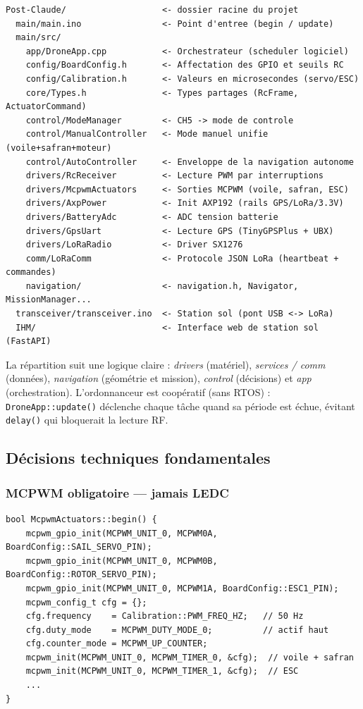 \documentclass[12pt,a4paper]{article}
\newcommand{\file}[1]{\texttt{#1}}
\begin{document}
\begin{lstlisting}[style=shell, caption={Arborescence du projet (racine = Post-Claude)}]
Post-Claude/                   <- dossier racine du projet
  main/main.ino                <- Point d'entree (begin / update)
  main/src/
    app/DroneApp.cpp           <- Orchestrateur (scheduler logiciel)
    config/BoardConfig.h       <- Affectation des GPIO et seuils RC
    config/Calibration.h       <- Valeurs en microsecondes (servo/ESC)
    core/Types.h               <- Types partages (RcFrame, ActuatorCommand)
    control/ModeManager        <- CH5 -> mode de controle
    control/ManualController   <- Mode manuel unifie (voile+safran+moteur)
    control/AutoController     <- Enveloppe de la navigation autonome
    drivers/RcReceiver         <- Lecture PWM par interruptions
    drivers/McpwmActuators     <- Sorties MCPWM (voile, safran, ESC)
    drivers/AxpPower           <- Init AXP192 (rails GPS/LoRa/3.3V)
    drivers/BatteryAdc         <- ADC tension batterie
    drivers/GpsUart            <- Lecture GPS (TinyGPSPlus + UBX)
    drivers/LoRaRadio          <- Driver SX1276
    comm/LoRaComm              <- Protocole JSON LoRa (heartbeat + commandes)
    navigation/                <- navigation.h, Navigator, MissionManager...
  transceiver/transceiver.ino  <- Station sol (pont USB <-> LoRa)
  IHM/                         <- Interface web de station sol (FastAPI)
\end{lstlisting}

La r\'epartition suit une logique claire : \emph{drivers} (mat\'eriel),
\emph{services / comm} (donn\'ees), \emph{navigation} (g\'eom\'etrie et mission),
\emph{control} (d\'ecisions) et \emph{app} (orchestration). L'ordonnanceur est
coop\'eratif (sans RTOS) : \file{DroneApp::update()} d\'eclenche chaque t\^ache
quand sa p\'eriode est \'echue, \'evitant \texttt{delay()} qui bloquerait la lecture
RF.

\subsection{D\'ecisions techniques fondamentales}

\subsubsection{MCPWM obligatoire --- jamais LEDC}

\begin{lstlisting}[style=cpp, caption={McpwmActuators.cpp -- initialisation MCPWM}]
bool McpwmActuators::begin() {
    mcpwm_gpio_init(MCPWM_UNIT_0, MCPWM0A, BoardConfig::SAIL_SERVO_PIN);
    mcpwm_gpio_init(MCPWM_UNIT_0, MCPWM0B, BoardConfig::ROTOR_SERVO_PIN);
    mcpwm_gpio_init(MCPWM_UNIT_0, MCPWM1A, BoardConfig::ESC1_PIN);
    mcpwm_config_t cfg = {};
    cfg.frequency    = Calibration::PWM_FREQ_HZ;   // 50 Hz
    cfg.duty_mode    = MCPWM_DUTY_MODE_0;          // actif haut
    cfg.counter_mode = MCPWM_UP_COUNTER;
    mcpwm_init(MCPWM_UNIT_0, MCPWM_TIMER_0, &cfg);  // voile + safran
    mcpwm_init(MCPWM_UNIT_0, MCPWM_TIMER_1, &cfg);  // ESC
    ...
}
\end{lstlisting}
\end{document}
